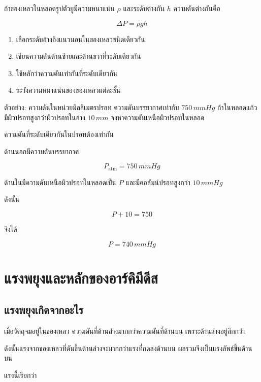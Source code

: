 ถ้าของเหลวในหลอดรูปตัวยูมีความหนาแน่น $\rho$ และระดับต่างกัน $h$ ความดันต่างกันคือ

\[
\Delta P=\rho gh
\]

\begin{tcolorbox}[title=หลักการแก้โจทย์หลอดรูปตัวยู]
\begin{enumerate}
    \item เลือกระดับอ้างอิงแนวนอนในของเหลวชนิดเดียวกัน
    \item เขียนความดันด้านซ้ายและด้านขวาที่ระดับเดียวกัน
    \item ใช้หลักว่าความดันเท่ากันที่ระดับเดียวกัน
    \item ระวังความหนาแน่นของของเหลวแต่ละชั้น
\end{enumerate}
\end{tcolorbox}

\begin{examplebox}{ตัวอย่าง: ความดันในหน่วยมิลลิเมตรปรอท}
ความดันบรรยากาศเท่ากับ $750\,\si{mmHg}$ ถ้าในหลอดแก้วมีผิวปรอทสูงกว่าผิวปรอทในอ่าง $10\,\si{mm}$ จงหาความดันเหนือผิวปรอทในหลอด

ความดันที่ระดับเดียวกันในปรอทต้องเท่ากัน

ด้านนอกมีความดันบรรยากาศ

\[
P_{\text{atm}}=750\,\si{mmHg}
\]

ด้านในมีความดันเหนือผิวปรอทในหลอดเป็น $P$ และมีคอลัมน์ปรอทสูงกว่า $10\,\si{mmHg}$

ดังนั้น

\[
P+10=750
\]

จึงได้

\[
P=740\,\si{mmHg}
\]
\end{examplebox}

\section{แรงพยุงและหลักของอาร์คิมีดีส}

\subsection{แรงพยุงเกิดจากอะไร}

เมื่อวัตถุจมอยู่ในของเหลว ความดันที่ด้านล่างมากกว่าความดันที่ด้านบน เพราะด้านล่างอยู่ลึกกว่า

ดังนั้นแรงจากของเหลวที่ดันขึ้นด้านล่างจะมากกว่าแรงที่กดลงด้านบน ผลรวมจึงเป็นแรงลัพธ์ขึ้นด้านบน

แรงนี้เรียกว่า

